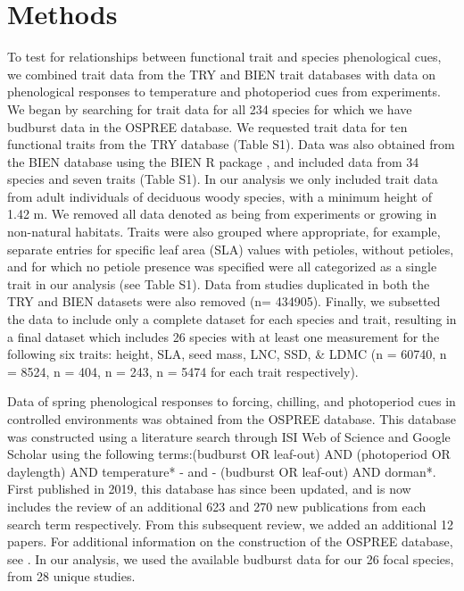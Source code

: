 \documentclass{article}\usepackage[]{graphicx}\usepackage[]{color}
\begin{document}
\section{Methods}
To test for relationships between functional trait and species phenological cues, we combined trait data from the TRY and BIEN trait databases with data on phenological responses to temperature and photoperiod cues from experiments. We began by searching for trait data for all 234 species for which we have budburst data in the OSPREE database. We requested trait data for ten functional traits from the TRY database (Table S1). Data was also obtained from the BIEN database using the BIEN R package \citep{Maitner2017}, and included data from 34 species and seven traits (Table S1). In our analysis we only included trait data from adult individuals of deciduous woody species, with a minimum height of 1.42 m. We removed all data denoted as being from experiments or growing in non-natural habitats. Traits were also grouped where appropriate, for example, separate entries for specific leaf area (SLA) values with petioles, without petioles, and for which no petiole presence was specified were all categorized as a single trait in our analysis (see Table S1). Data from studies duplicated in both the TRY and BIEN datasets were also removed (n= 434905).  Finally, we subsetted the data to include only a complete dataset for each species and trait, resulting in a final dataset which includes 26 species with at least one measurement for the following six traits: height, SLA, seed mass, LNC, SSD, \& LDMC (n = 60740, n = 8524, n = 404, n = 243, n = 5474 for each trait respectively). %

Data of spring phenological responses to forcing, chilling, and photoperiod cues in controlled environments was obtained from the OSPREE database. This database was constructed using a literature search through ISI Web of Science and Google Scholar using the following terms:(budburst OR leaf-out) AND (photoperiod OR daylength) AND temperature* - and - (budburst OR leaf-out) AND dorman*. First published in 2019, this database has since been updated, and is now includes the review of an additional 623 and 270 new publications from each search term respectively. From this subsequent review, we added an additional 12 papers. For additional information on the construction of the OSPREE database, see \citep{OSPREE}. In our analysis, we used the available budburst data for our 26 focal species, from 28 unique studies. %
\end{document}
